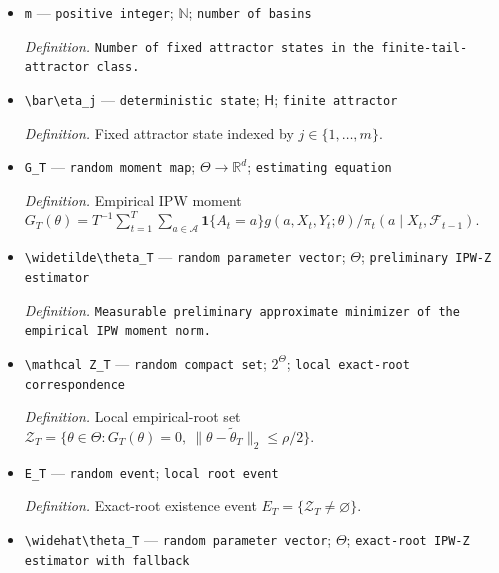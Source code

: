 \documentclass{article}
\begin{document}
\begin{itemize}
  \par\smallskip\noindent\emph{Definition.} Population Jacobian \(H=\partial_\theta E_P[\sum_{a\in\mathcal A}g(a,X_t,Y_t(a);\theta)]|_{\theta=\theta^*}\).
  \item \texttt{m} --- \texttt{positive integer}; \(\mathbb N\); \texttt{number of basins}
  \par\smallskip\noindent\emph{Definition.} \texttt{Number of fixed attractor states in the finite-\allowbreak{}tail-\allowbreak{}attractor class.}
  \item \texttt{\textbackslash{}\allowbreak{}bar\textbackslash{}\allowbreak{}eta\_\allowbreak{}j} --- \texttt{deterministic state}; \(\mathsf H\); \texttt{finite attractor}
  \par\smallskip\noindent\emph{Definition.} Fixed attractor state indexed by \(j\in\{1,\ldots,m\}\).
  \item \texttt{G\_\allowbreak{}T} --- \texttt{random moment map}; \(\Theta\to\mathbb R^d\); \texttt{estimating equation}
  \par\smallskip\noindent\emph{Definition.} Empirical IPW moment \(G_T(\theta)=T^{-1}\sum_{t=1}^T\sum_{a\in\mathcal A}\mathbf 1\{A_t=a\}g(a,X_t,Y_t;\theta)/\pi_t(a\mid X_t,\mathcal F_{t-1})\).
  \item \texttt{\textbackslash{}\allowbreak{}widetilde\textbackslash{}\allowbreak{}theta\_\allowbreak{}T} --- \texttt{random parameter vector}; \(\Theta\); \texttt{preliminary IPW-\allowbreak{}Z estimator}
  \par\smallskip\noindent\emph{Definition.} \texttt{Measurable preliminary approximate minimizer of the empirical IPW moment norm.}
  \item \texttt{\textbackslash{}\allowbreak{}mathcal Z\_\allowbreak{}T} --- \texttt{random compact set}; \(2^\Theta\); \texttt{local exact-\allowbreak{}root correspondence}
  \par\smallskip\noindent\emph{Definition.} Local empirical-root set \(\mathcal Z_T=\{\theta\in\Theta:G_T(\theta)=0,\ \|\theta-\widetilde\theta_T\|_2\le\rho/2\}\).
  \item \texttt{E\_\allowbreak{}T} --- \texttt{random event}; \texttt{local root event}
  \par\smallskip\noindent\emph{Definition.} Exact-root existence event \(E_T=\{\mathcal Z_T\ne\varnothing\}\).
  \item \texttt{\textbackslash{}\allowbreak{}widehat\textbackslash{}\allowbreak{}theta\_\allowbreak{}T} --- \texttt{random parameter vector}; \(\Theta\); \texttt{exact-\allowbreak{}root IPW-\allowbreak{}Z estimator with fallback}

\end{itemize}
\end{document}
